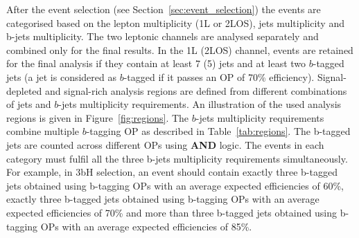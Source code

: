 After the event selection (see Section~\ref{sec:event_selection}) the events are categorised based on the lepton multiplicity (1L or 2LOS), jets multiplicity and b-jets multiplicity. The two leptonic channels are analysed separately and combined only for the final results. 
In the 1L (2LOS) channel, events are retained for the final analysis if they contain at least 7 (5) jets and at least two $b$-tagged jets (a jet is considered as $b$-tagged if it passes an OP of 70\% efficiency). 
Signal-depleted and signal-rich analysis regions are defined from different combinations of jets and $b$-jets multiplicity requirements.  
An illustration of the used analysis regions is given in Figure~\ref{fig:regions}. The $b$-jets multiplicity requirements combine multiple $b$-tagging OP as described in Table~\ref{tab:regions}. The b-tagged jets are counted across different OPs using \textbf{AND} logic. The events in each category must fulfil all the three b-jets multiplicity requirements simultaneously. For example, in 3bH selection, an event should contain exactly three b-tagged jets obtained using b-tagging OPs with an average expected efficiencies of 60\%, exactly three b-tagged jets obtained using b-tagging OPs with an average expected efficiencies of 70\% and more than three b-tagged jets obtained using b-tagging OPs with an average expected efficiencies of 85\%.

